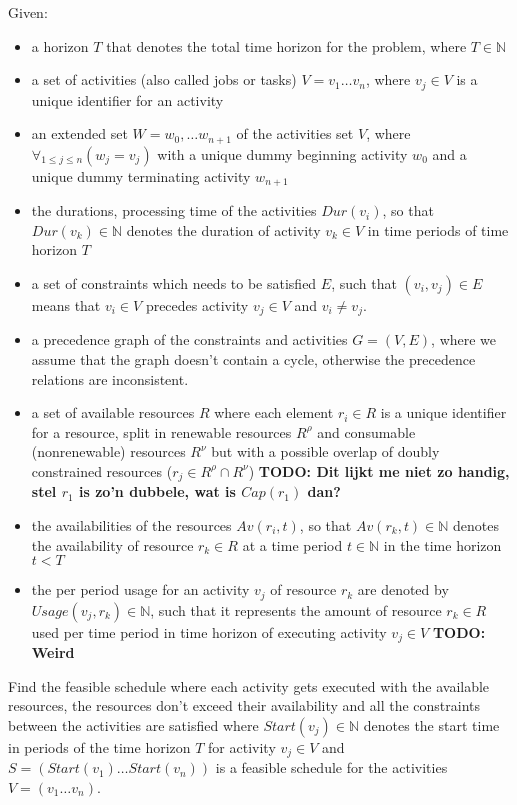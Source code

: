 \documentclass{article}
\newcommand{\TODO}[1]{{\color{red}\textbf{TODO: #1}}}
\newcommand{\renres}[0]{R^\rho} %
\newcommand{\conres}[0]{R^\nu} %
\newcommand{\av}[1]{\textit{Av}(#1)} %
\newcommand{\dur}[1]{\textit{Dur}(#1)} %
\newcommand{\usage}[1]{\textit{Usage}(#1)} %
\newcommand{\start}[1]{\textit{Start}(#1)} %
\begin{document}
Given:
\begin{itemize}
\item a horizon $T$ that denotes the total time horizon for the problem, where $T \in \mathbb{N}$
\item a set of activities (also called jobs or tasks) $V = v_1 \ldots v_n$, where $v_j \in V$ is a unique identifier for an activity
\item an extended set $W = w_0, \ldots w_{n+1}$ of the activities set $V$, where $\forall_{1 \leq j \leq n} (w_j = v_j)$ with a unique dummy beginning activity $w_0$ and a unique dummy terminating activity $w_{n+1}$
\item the durations, processing time of the activities $\dur{v_i}$, so that $\dur{v_k} \in \mathbb{N}$ denotes the duration of activity $v_k \in V$ in time periods of time horizon $T$
\item a set of constraints which needs to be satisfied $E$, such that $(v_i,v_j) \in E$ means that $v_i \in V$ precedes activity $v_j \in V$ and $v_i \neq v_j$.
\item a precedence graph of the constraints and activities $G = (V, E)$, where we assume that the graph doesn't contain a cycle, otherwise the precedence relations are inconsistent.
\item a set of available resources $R$ where each element $r_i \in R$ is a unique identifier for a resource, split in renewable resources $\renres$ and  consumable (nonrenewable) resources $\conres$ but with a possible overlap of doubly constrained resources ($r_j \in \renres \cap \conres$) \TODO{Dit lijkt me niet zo handig, stel $r_1$ is zo'n dubbele, wat is $Cap(r_1)$ dan?}
\item the availabilities of the resources $\av{r_i, t}$, so that $\av{r_k, t} \in \mathbb{N}$ denotes the availability of resource $r_k \in R$ at a time period $t \in \mathbb{N}$ in the time horizon $t < T$
\item the per period usage for an activity $v_j$ of resource $r_k$ are denoted by $\usage{v_j, r_k} \in \mathbb{N}$, such that it represents the amount of resource $r_k \in R$ used per time period in time horizon of executing activity $v_j \in V$ \TODO{Weird}
\end{itemize}

Find the feasible schedule where each activity gets executed with the available resources, the resources don't exceed their availability and all the constraints between the activities are satisfied where $\start{v_j} \in \mathbb{N}$ denotes the start time in periods of the time horizon $T$ for activity $v_j \in V$ and
$S = (\start{v_1} \ldots \start{v_n})$ is a feasible schedule for the activities $V = (v_1 \ldots v_n)$.
\end{document}
